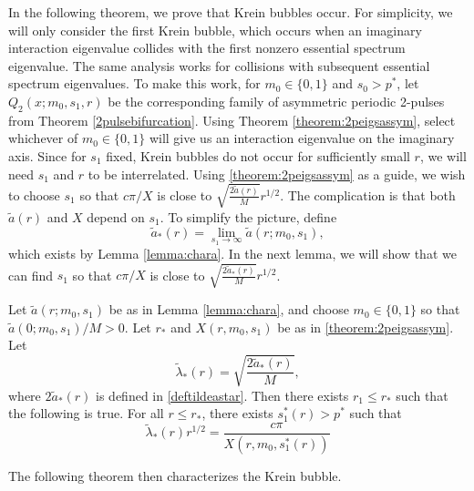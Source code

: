 \documentclass[thesis.tex]{subfiles}
\begin{document}
In the following theorem, we prove that Krein bubbles occur. For simplicity, we will only consider the first Krein bubble, which occurs when an imaginary interaction eigenvalue collides with the first nonzero essential spectrum eigenvalue. The same analysis works for collisions with subsequent essential spectrum eigenvalues. To make this work, for $m_0 \in \{ 0, 1 \}$ and $s_0 > p^*$, let $Q_2(x; m_0, s_1, r)$ be the corresponding family of asymmetric periodic 2-pulses from Theorem \ref{2pulsebifurcation}. Using Theorem \ref{theorem:2peigsassym}, select whichever of $m_0 \in \{ 0, 1 \}$ will give us an interaction eigenvalue on the imaginary axis. Since for $s_1$ fixed, Krein bubbles do not occur for sufficiently small $r$, we will need $s_1$ and $r$ to be interrelated. Using \cref{theorem:2peigsassym} as a guide, we wish to choose $s_1$ so that $c \pi/X$ is close to $\sqrt{\frac{2 \tilde{a}(r)}{M}}r^{1/2}$. The complication is that both $\tilde{a}(r)$ and $X$ depend on $s_1$. To simplify the picture, define
\begin{equation}\label{deftildeastar}
\tilde{a}_*(r) = \lim_{s_1 \rightarrow \infty} \tilde{a}(r; m_0, s_1),
\end{equation}
which exists by Lemma \ref{lemma:chara}. In the next lemma, we will show that we can find $s_1$ so that $c \pi/X$ is close to $\sqrt{\frac{2 \tilde{a}_*(r)}{M}}r^{1/2}$.

\begin{lemma}\label{lemma:s1choice}
Let $\tilde{a}(r; m_0, s_1)$ be as in Lemma \ref{lemma:chara}, and choose $m_0 \in \{ 0, 1\}$ so that $\tilde{a}(0; m_0, s_1)/M > 0$. Let $r_*$ and $X(r, m_0, s_1)$ be as in \cref{theorem:2peigsassym}. Let
\begin{equation}\label{tildelambdastar}
\tilde{\lambda}_*(r) = \sqrt{\frac{ 2 \tilde{a}_*(r) }{M}},
\end{equation}
where $2 \tilde{a}_*(r)$ is defined in \cref{deftildeastar}. Then there exists $r_1 \leq r_*$ such that the following is true. For all $r \leq r_*$, there exists $s_1^*(r) > p^*$ such that
\begin{equation}\label{choosesstar}
\tilde{\lambda}_*(r) r^{1/2} = \frac{c \pi}{X(r, m_0, s_1^*(r))}
\end{equation}
\end{lemma}

The following theorem then characterizes the Krein bubble.
\end{document}
